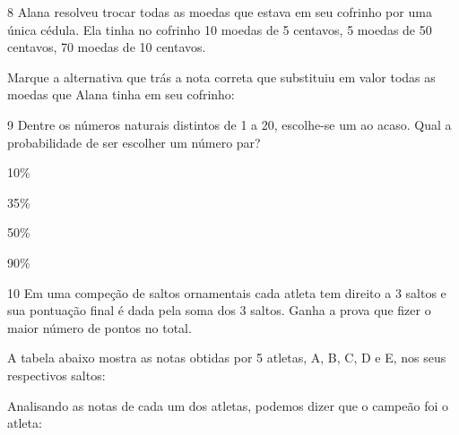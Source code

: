 \num{8} Alana resolveu trocar todas as moedas que estava em seu cofrinho
por uma única cédula. Ela tinha no cofrinho 10 moedas de 5 centavos, 5
moedas de 50 centavos, 70 moedas de 10 centavos.

Marque a alternativa que trás a nota correta que substituiu em valor
todas as moedas que Alana tinha em seu cofrinho:



\num{9} Dentre os números naturais distintos de 1 a 20, escolhe-se um ao
acaso. Qual a probabilidade de ser escolher um número par?

\begin{escolha}
\item
  10\%
\item
  35\%
\item
  50\%
\item
  90\%
\end{escolha}


\num{10} Em uma compeção de saltos ornamentais cada atleta tem direito a 3
saltos e sua pontuação final é dada pela soma dos 3 saltos. Ganha a
prova que fizer o maior número de pontos no total.

A tabela abaixo mostra as notas obtidas por 5 atletas, A, B, C, D e E,
nos seus respectivos saltos:


Analisando as notas de cada um dos atletas, podemos dizer que o campeão
foi o atleta:

